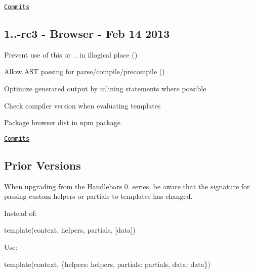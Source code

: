 \href{https://github.com/wycats/handlebars.js/compare/1.0.0-rc.3...v1.0.9}{\tt Commits}

\subsection*{1..-\/rc3 -\/ Browser -\/ Feb 14 2013}


\begin{DoxyItemize}
\item Prevent use of {\ttfamily this} or {\ttfamily ..} in illogical place (\href{https://github.com/leshill}{\tt })
\item Allow A\+S\+T passing for {\ttfamily parse}/{\ttfamily compile}/{\ttfamily precompile} (\href{https://github.com/machty}{\tt })
\item Optimize generated output by inlining statements where possible
\item Check compiler version when evaluating templates
\item Package browser dist in npm package
\end{DoxyItemize}

\href{https://github.com/wycats/handlebars.js/compare/v1.0.8...1.0.0-rc.3}{\tt Commits}

\subsection*{Prior Versions}

When upgrading from the Handlebars 0. series, be aware that the signature for passing custom helpers or partials to templates has changed.

Instead of\+:


\begin{DoxyCode}
\textcolor{keyword}{template}(context, helpers, partials, [data])
\end{DoxyCode}


Use\+:


\begin{DoxyCode}
\textcolor{keyword}{template}(context, \{helpers: helpers, partials: partials, data: data\})
\end{DoxyCode}
 